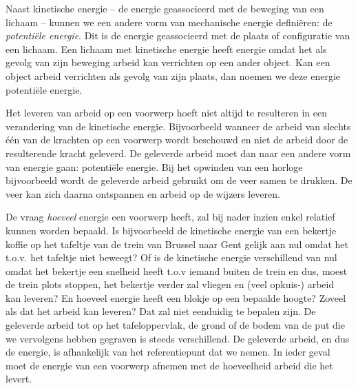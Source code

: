 \documentclass{ximera}
\begin{document}
	\author{Bart Lambregs}
    \xmsource




	Naast kinetische energie -- de energie geassocieerd met de beweging van een lichaam -- kunnen we een andere vorm van mechanische energie defini\"eren: de \textit{potenti\"ele energie}. Dit is de energie geassocieerd met de plaats of configuratie van een lichaam. Een lichaam met kinetische energie heeft energie omdat het als gevolg van zijn beweging arbeid kan verrichten op een ander object. Kan een object arbeid verrichten als gevolg van zijn plaats, dan noemen we deze energie potenti\"ele energie.
	
	Het leveren van arbeid op een voorwerp hoeft niet altijd te resulteren in een verandering van de kinetische energie. Bijvoorbeeld wanneer de arbeid van slechts \'e\'en van de krachten op een voorwerp wordt beschouwd en niet de arbeid door de resulterende kracht geleverd. De geleverde arbeid moet dan naar een andere vorm van energie gaan: potenti\"ele energie. Bij het opwinden van een horloge bijvoorbeeld wordt de geleverde arbeid gebruikt om de veer samen te drukken. De veer kan zich daarna ontspannen en arbeid op de wijzers leveren.
	
	De vraag \textit{hoeveel} energie een voorwerp heeft, zal bij nader inzien enkel relatief kunnen worden bepaald. Is bijvoorbeeld de kinetische energie van een bekertje koffie op het tafeltje van de trein van Brussel naar Gent gelijk aan nul omdat het t.o.v. het tafeltje niet beweegt? Of is de kinetische energie verschillend van nul omdat het bekertje een snelheid heeft t.o.v iemand buiten de trein en dus, moest de trein plots stoppen, het bekertje verder zal vliegen en (veel opkuis-) arbeid kan leveren? En hoeveel energie heeft een blokje op een bepaalde hoogte? Zoveel als dat het arbeid kan leveren? Dat zal niet eenduidig te bepalen zijn. De geleverde arbeid tot op het tafeloppervlak, de grond of de bodem van de put die we vervolgens hebben gegraven is steeds verschillend. De geleverde arbeid, en dus de energie, is afhankelijk van het referentiepunt dat we nemen. In ieder geval moet de energie van een voorwerp afnemen met de hoeveelheid arbeid die het levert.
	
	
\end{document}
